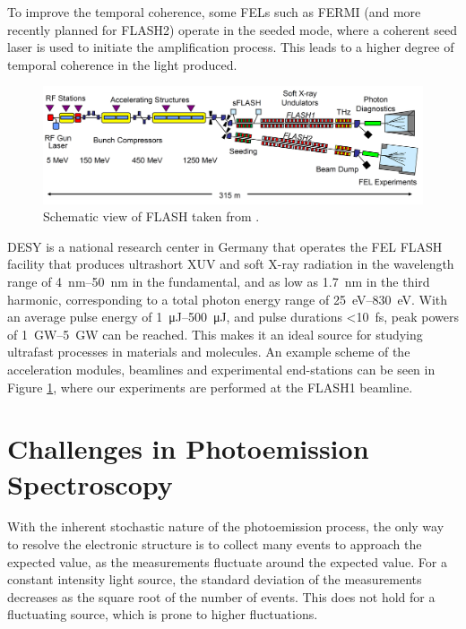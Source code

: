 To improve the temporal coherence, some \glspl{FEL} such as FERMI \cite{svandrlikDevelopmentPerspectivesFERMI2017} (and more recently planned for FLASH2) operate in the seeded mode, where a coherent seed laser is used to initiate the amplification process. This leads to a higher degree of temporal coherence in the light produced.

\begin{figure}
    \includegraphics[width=1\linewidth]{images/flash_fel.png}
    \caption{Schematic view of \gls{FLASH} taken from \cite{faatzSimultaneousOperationTwo2016}.}
    \label{fig:flash-schematic}
\end{figure}

\gls{DESY} is a national research center in Germany that operates the \gls{FEL} \gls{FLASH} facility \cite{ackermannOperationFreeelectronLaser2007,tiedtkeSoftXrayFreeelectron2009} that produces ultrashort \gls{XUV} and soft X-ray radiation in the wavelength range of \qtyrange{4}{50}{\nm} in the fundamental, and as low as \qty{1.7}{\nm} in the third harmonic, corresponding to a total photon energy range of \qtyrange{25}{830}{\eV}. With an average pulse energy of \qtyrange{1}{500}{\micro\joule}, and pulse durations \qty{<10}{\fs}, peak powers of \qtyrange{1}{5}{\giga\watt} can be reached. This makes it an ideal source for studying ultrafast processes in materials and molecules. An example scheme of the acceleration modules, \glspl{beamline} and experimental end-stations can be seen in Figure \ref{fig:flash-schematic}, where our experiments are performed at the FLASH1 beamline.

\section{Challenges in Photoemission Spectroscopy}
With the inherent stochastic nature of the photoemission process, the only way to resolve the electronic structure is to collect many events to approach the expected value, as the measurements fluctuate around the expected value. For a constant intensity light source, the standard deviation of the measurements decreases as the square root of the number of events. This does not hold for a fluctuating source, which is prone to higher fluctuations. 

